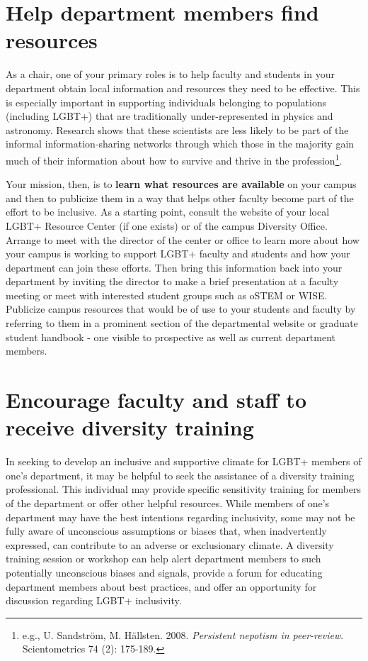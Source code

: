 \section {Help department members find resources}
\label{find-resources}
As a chair, one of your primary roles is to help faculty and students in your department obtain local information and resources they need to be effective. This is especially important in supporting individuals belonging to populations (including LGBT+) that are traditionally under-represented in physics and astronomy. Research shows that these scientists are less likely to be part of the informal information-sharing networks through which those in the majority gain much of their information about how to survive and thrive in the profession\footnote{e.g., U. Sandstr\"{o}m, M. H\"{a}llsten. 2008. \emph{Persistent nepotism in peer-review}. Scientometrics 74 (2): 175-189.}.

Your mission, then, is to \textbf{learn what resources are available} on your campus and then to publicize them in a way that helps other faculty become part of the effort to be inclusive. As a starting point, consult the website of your local LGBT+ Resource Center (if one exists) or of the campus Diversity Office. Arrange to meet with the director of the center or office to learn more about how your campus is working to support LGBT+ faculty and students and how your department can join these efforts. Then bring this information back into your department by inviting the director to make a brief presentation at a faculty meeting or meet with interested student groups such as oSTEM or WISE. Publicize campus resources that would be of use to your students and faculty by referring to them in a prominent section of the departmental website or graduate student handbook - one visible to prospective as well as current department members.


\section {Encourage faculty and staff to receive diversity training}
\label{diversity-training}
In seeking to develop an inclusive and supportive climate for LGBT+ members of one's department, it may be helpful to seek the assistance of a diversity training professional. This individual may provide specific sensitivity training for members of the department or offer other helpful resources. While members of one's department may have the best intentions regarding inclusivity, some may not be fully aware of unconscious assumptions or biases that, when inadvertently expressed, can contribute to an adverse or exclusionary climate. A diversity training session or workshop can help alert department members to such potentially unconscious biases and signals, provide a forum for educating department members about best practices, and offer an opportunity for discussion regarding LGBT+ inclusivity.

